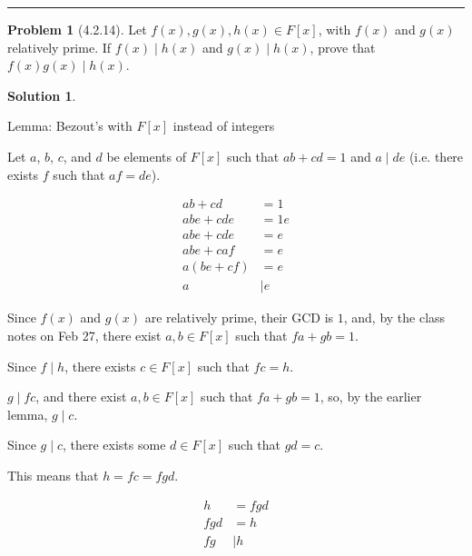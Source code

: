\documentclass[12pt]{article}
\theoremstyle{definition}
\newtheorem*{prob}{Problem}
\newtheorem*{soln}{Solution}
\newcommand{\hr}{\vspace*{\parskip}\hrule}
\newcommand{\ZZ}{{\mathbb{Z}}}
\begin{document}
%
%
%

\hr

\begin{prob}[4.2.14]
Let $f(x), g(x), h(x)\in F[x]$, with $f(x)$ and $g(x)$ relatively prime. 
If  $f(x) \mid h(x)$ and $g(x) \mid h(x)$, prove that $f(x)g(x) \mid h(x)$.
\end{prob}

\begin{soln}

\quad

\begin{stonk}

Lemma: Bezout's with $F[x]$ instead of integers

Let $a$, $b$, $c$, and $d$ be elements of $F[x]$
such that $ab+cd=1$
and $a\mid de$
(i.e. there exists $f$ such that $af=de$).

\begin{align*}
ab+cd&=1\\
abe+cde&=1e\\
abe+cde&=e\\
abe+caf&=e\\
a(be+cf)&=e\\
a&\mid e
\end{align*}

\end{stonk}

Since $f(x)$ and $g(x)$ are relatively prime,
their GCD is $1$,
and, by the class notes on Feb 27,
there exist $a,b\in F[x]$ such that
$fa+gb=1$.

Since $f\mid h$, there exists $c\in F[x]$
such that $fc=h$.

$g\mid fc$, and there exist $a,b\in F[x]$ such that $fa+gb=1$,
so, by the earlier lemma, $g\mid c$.

Since $g\mid c$, there exists some $d\in F[x]$ such that $gd=c$.

This means that $h=fc=fgd$.

\begin{align*}
h&=fgd\\
fgd&=h\\
fg&\mid h
\end{align*}

\end{soln}
\end{document}
